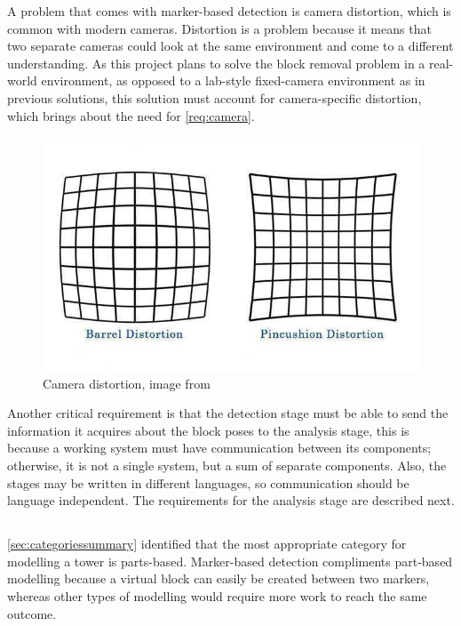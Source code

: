 A problem that comes with marker-based detection is camera distortion, which is common with modern cameras. Distortion is a problem because it means that two separate cameras could look at the same environment and come to a different understanding. As this project plans to solve the block removal problem in a real-world environment, as opposed to a lab-style fixed-camera environment as in previous solutions, this solution must account for camera-specific distortion, which brings about the need for \cref{req:camera}.

\begin{figure}[ht]
\begin{minipage}{\textwidth}
    \centering
    \includegraphics[width=.6\textwidth]{images/requirements/camera-distortion.jpg}
    \caption{Camera distortion, image from \protect{}}
    \label{fig:cameradistortion}
\end{minipage}
\end{figure}

Another critical requirement is that the detection stage must be able to send the information it acquires about the block poses to the analysis stage, this is because a working system must have communication between its components; otherwise, it is not a single system, but a sum of separate components. Also, the stages may be written in different languages, so communication should be language independent. The requirements for the analysis stage are described next.

\subsection{\analysis}

\cref{sec:categoriessummary} identified that the most appropriate category for modelling a \jenga{} tower is parts-based. Marker-based detection compliments part-based modelling because a virtual block can easily be created between two markers, whereas other types of modelling would require more work to reach the same outcome.

